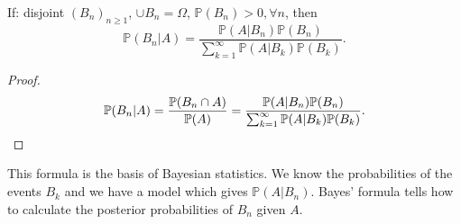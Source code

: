 \begin{corollary}\label{thm:Bayes' formula}
    If: disjoint $ (B_n)_{n\ge 1} $, $ \cup B_n=\Omega $, $ \mathbb{P}(B_n)>0, \forall n $, then 
    \[
        \mathbb{P}(B_n|A) = \frac{\mathbb{P}(A|B_n)\mathbb{P}(B_n)}{\sum_{k=1}^{\infty}\mathbb{P}(A|B_k)\mathbb{P}(B_k)}.
    \]
\end{corollary}
\begin{proof}
    \[
        \mathbb{P}(B_n|A) = \frac{{\mathbb{P}}(B_n\cap A)}{{\mathbb{P}}(A)}= \frac{\mathbb{P}(A|B_n)\mathbb{P}(B_n)}{\sum_{k=1}^{\infty}\mathbb{P}(A|B_k)\mathbb{P}(B_k)}.
    \]
\end{proof}
This formula is the basis of Bayesian statistics. We know the probabilities of the events $ B_k $ and we have a model which gives $ \mathbb{P}(A|B_n) $. Bayes' formula tells how to calculate the posterior probabilities of $ B_n $ given $A$.
